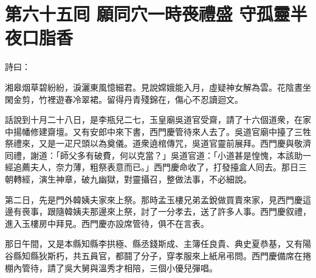 
\chapter*{第六十五囘 願同穴一時䘮禮盛 守孤靈半夜口脂香}


詩曰：

湘皋烟草碧紛紛，淚灑東風憶細君。見說嫦娥能入月，虛疑神女解為雲。花陰晝坐閑金剪，竹裡遊春冷翠裙。留得丹青殘錦在，傷心不忍讀迴文。

話說到十月二十八日，是李瓶兒二七，玉皇廟吳道官受齋，請了十六個道衆，在家中揚幡修建齋壇。又有安郎中來下書，西門慶管待來人去了。吳道官廟中擡了三牲祭禮來，又是一疋尺頭以為奠儀。道衆遶棺傳咒，吳道官靈前展拜。西門慶與敬濟囘禮，謝道：「師父多有破費，何以克當？」吳道官道：「小道甚是惶愧，本該助一經追薦夫人，奈力薄，粗祭表意而已。」西門慶命收了，打發擡盒人囘去。那日三朝轉經，演生神章，破九幽獄，對靈攝召，整做法事，不必細說。

第二日，先是門外韓姨夫家來上祭。那時孟玉樓兄弟孟銳做買賣來家，{}見西門慶這邊有䘮事，跟隨韓姨夫那邊來上祭，討了一分孝去，送了許多人事。西門慶叙禮，進入玉樓房中拜見。西門慶亦設席管待，俱不在言表。

那日午間，又是本縣知縣李拱極、縣丞錢斯成、主簿任良貴、典史夏恭基，又有陽谷縣知縣狄斯朽，共五員官，都鬪了分子，穿孝服來上紙帛弔問。西門慶備席在捲棚內管待，請了吳大舅與溫秀才相陪，三個小優兒彈唱。

